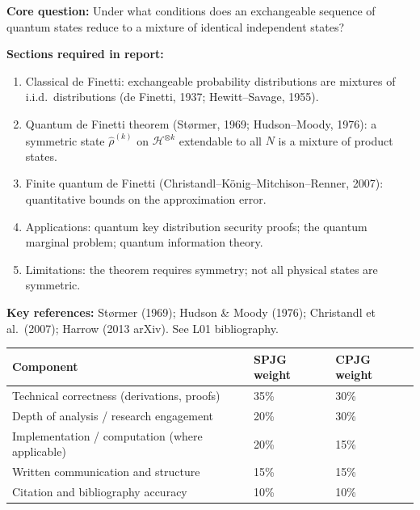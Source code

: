 \documentclass[11pt,a4paper]{article}
\begin{document}
\bigskip

\begin{tcolorbox}[gradprobbox, title={Project CG5 --- The Quantum de Finetti Theorem}]
\textbf{Core question:} Under what conditions does an exchangeable sequence of
quantum states reduce to a mixture of identical independent states?

\medskip\textbf{Sections required in report:}
\begin{enumerate}[leftmargin=1.8em, label=\textbf{\arabic*.}, itemsep=6pt]
  \item Classical de Finetti: exchangeable probability distributions are mixtures
        of i.i.d.\ distributions (de Finetti, 1937; Hewitt--Savage, 1955).
  \item Quantum de Finetti theorem (Størmer, 1969; Hudson--Moody, 1976):
        a symmetric state $\hat{\rho}^{(k)}$ on $\mathcal{H}^{\otimes k}$
        extendable to all $N$ is a mixture of product states.
  \item Finite quantum de Finetti (Christandl--König--Mitchison--Renner, 2007):
        quantitative bounds on the approximation error.
  \item Applications: quantum key distribution security proofs; the quantum
        marginal problem; quantum information theory.
  \item Limitations: the theorem requires symmetry; not all physical states are symmetric.
\end{enumerate}

\medskip\textbf{Key references:} Størmer (1969); Hudson \& Moody (1976);
Christandl et al.\ (2007); Harrow (2013 arXiv). See L01 bibliography.
\end{tcolorbox}

\bigskip
\begin{tcolorbox}[rubricbox, title={SPJG / CPJG Global Rubric}]
\begin{tabular}{lll}
\toprule
Component & SPJG weight & CPJG weight\\
\midrule
Technical correctness (derivations, proofs)     & 35\% & 30\%\\
Depth of analysis / research engagement         & 20\% & 30\%\\
Implementation / computation (where applicable) & 20\% & 15\%\\
Written communication and structure             & 15\% & 15\%\\
Citation and bibliography accuracy              & 10\% & 10\%\\
\bottomrule
\end{tabular}
\end{tcolorbox}
\end{document}
